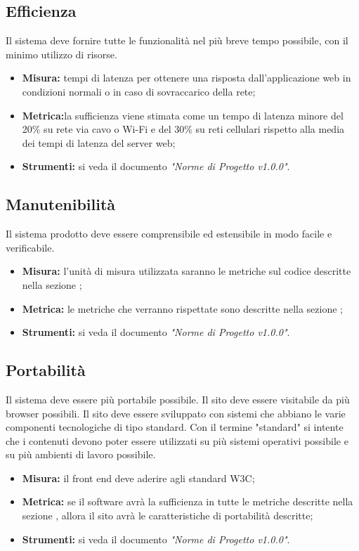\documentclass[12pt,a4paper,titlepage]{article}
\begin{document}
		\subsection{Efficienza}
		Il sistema deve fornire tutte le funzionalità nel più breve tempo possibile, con il minimo utilizzo di risorse.
		\begin{itemize}
			\item \textbf{Misura:} tempi di latenza per ottenere una risposta dall'applicazione web in condizioni normali o in caso di sovraccarico della rete;
			\item \textbf{Metrica:}la sufficienza viene stimata come un tempo di latenza minore del 20\% su rete via cavo o Wi-Fi e del 30\% su reti cellulari rispetto alla media dei tempi di latenza del server web;
			\item \textbf{Strumenti:} si veda il documento \textit{"Norme di Progetto v1.0.0"}.
		\end{itemize}
		\subsection{Manutenibilità}
		Il sistema prodotto deve essere comprensibile ed estensibile in modo facile e verificabile.
		\begin{itemize}
			\item \textbf{Misura:} l'unità di misura utilizzata saranno le metriche sul codice descritte nella sezione ;
			\item \textbf{Metrica:} le metriche che verranno rispettate sono descritte nella sezione ;
			\item \textbf{Strumenti:} si veda il documento \textit{"Norme di Progetto v1.0.0"}.
		\end{itemize}
		\subsection{Portabilità}
		Il sistema deve essere più portabile possibile. Il sito deve essere visitabile da più browser possibili. Il sito deve essere sviluppato con sistemi che abbiano le varie componenti tecnologiche di tipo standard. Con il termine "standard" si intente che i contenuti devono poter essere utilizzati su più sistemi operativi possibile e su più ambienti di lavoro possibile.
			\begin{itemize}
				\item \textbf{Misura:} il front end deve aderire agli standard W3C;
				\item \textbf{Metrica:} se il software avrà la sufficienza in tutte le metriche descritte nella sezione , allora il sito avrà le caratteristiche di portabilità descritte;
				\item \textbf{Strumenti:} si veda il documento \textit{"Norme di Progetto v1.0.0"}.
			\end{itemize}
\end{document}
